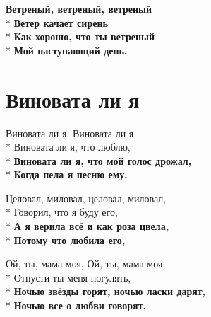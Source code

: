 \medskip

\begin{minipage}{\linewidth}
\hspace*{1.5em}\textbf{Ветреный, ветреный, ветреный}\\*
\hspace*{1.5em}\textbf{Ветер качает сирень}\\*
\hspace*{1.5em}\textbf{Как хорошо, что ты ветреный}\\*
\hspace*{1.5em}\textbf{Мой наступающий день.}\\
\end{minipage}

\vspace{\fill}\newpage

\section{Виновата ли я}
\label{song:Виновата_ли_я}

\medskip

\begin{minipage}{\linewidth}
Виновата ли я, Виновата ли я,\\*
Виновата ли я, что люблю,\\*
\textbf{Виновата ли я, что мой голос дрожал,}\\*
\textbf{Когда пела я песню ему.}\\
\end{minipage}\par\medskip\nobreak

\medskip

\begin{minipage}{\linewidth}
Целовал, миловал, целовал, миловал,\\*
Говорил, что я буду его,\\*
\textbf{А я верила всё и как роза цвела,}\\*
\textbf{Потому что любила его,}\\
\end{minipage}\par\medskip\nobreak

\medskip

\begin{minipage}{\linewidth}
Ой, ты, мама моя, Ой, ты, мама моя,\\*
Отпусти ты меня погулять,\\*
\textbf{Ночью звёзды горят, ночью ласки дарят,}\\*
\textbf{Ночью все о любви говорят.}\\
\end{minipage}\par\medskip\nobreak

